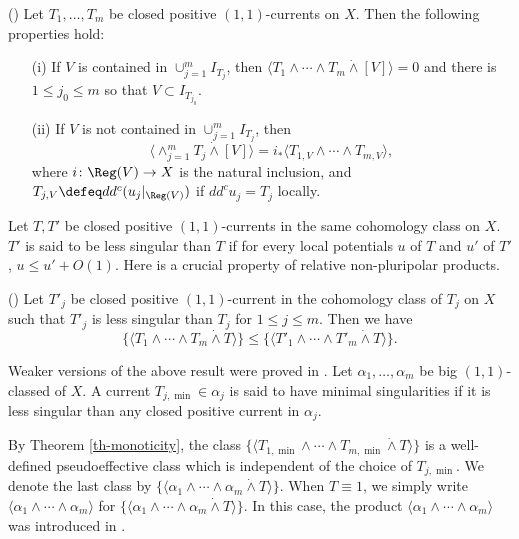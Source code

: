     \begin{lemma}\label{nonpluripolar_restriction} (\cite[Lemma 2.3]{Vu-derivative})
        Let $T_1, \dots , T_m$ be closed positive $(1,1)$-currents on $X$. Then the following properties hold:
        \begin{itemize}
            \item[(i)] If $V$ is contained in $\cup_{j=1}^{m}I_{T_j}$, then $\langle T_1 \wedge \dotsi \wedge T_m \dot{\wedge} [V] \rangle=0$ and there is $1 \leq j_0 \leq m$ so that $V \subset I_{T_{j_0}}$.

            \item[(ii)] If $V$ is not contained in $\cup_{j=1}^{m}I_{T_j}$, then 
            \[
                \langle \wedge_{j=1}^{m}  T_j \dot{\wedge} [V] \rangle = i_{*} \langle T_{1,V} \wedge \dotsi \wedge T_{m,V} \rangle,  
            \]
            where $i \colon \Reg(V) \rightarrow X$ is the natural inclusion, and $T_{j,V} \defeq d d^{c}(u_{j}|_{\Reg(V)})$ if $dd^{c}u_j=T_j$ locally.
        \end{itemize}
    \end{lemma}




    Let $T, T'$ be closed positive $(1,1)$-currents in the same cohomology class on $X$. $T'$ is said to be less singular than $T$ if for every local potentials $u$ of $T$ and $u'$ of $T'$, $u \leq u' + O(1)$. Here is a crucial property of relative non-pluripolar products.

    \begin{theorem} \label{th-monoticity} (\cite[Theorem 1.1]{Viet-generalized-nonpluri})   
        Let $T'_j$ be closed positive $(1,1)$-current in the cohomology class of $T_j$ on $X$ such that $T'_j$ is less singular than $T_j$ for $1 \le j \le m$. Then we have 
        $$\{\langle T_1 \wedge \cdots \wedge T_m \dot{\wedge} T \rangle \} \le \{\langle T'_1 \wedge \cdots \wedge T'_m \dot{\wedge} T \rangle\}.$$
    \end{theorem}

    Weaker versions of the above result were proved in  \cite{BEGZ,Lu-Darvas-DiNezza-mono,WittNystrom-mono}. Let $\alpha_1, \dots , \alpha_m$ be big $(1,1)$-classed of $X$. A current $T_{j,\min} \in \alpha_j$ is said to have minimal singularities if it is less singular than any closed positive current in $\alpha_j$.



    By Theorem \ref{th-monoticity}, the class $\{\langle T_{1,\min} \wedge \dotsi \wedge T_{m,\min} \dot{\wedge}T \rangle\}$ is a well-defined pseudoeffective class which is independent of the choice of $T_{j,\min}$. We denote the last class by $\{\langle \alpha_{1} \wedge \dotsi \wedge \alpha_{m} \dot{\wedge} T \rangle \}$. When $T \equiv 1$, we simply write $\langle \alpha_{1} \wedge \dotsi \wedge \alpha_{m} \rangle$ for $\{\langle \alpha_{1} \wedge \dotsi \wedge \alpha_{m} \dot{\wedge} T \rangle \}$. In this case,  the product $\langle \alpha_{1} \wedge \dotsi \wedge \alpha_{m} \rangle $  was introduced in \cite{BEGZ}.  

